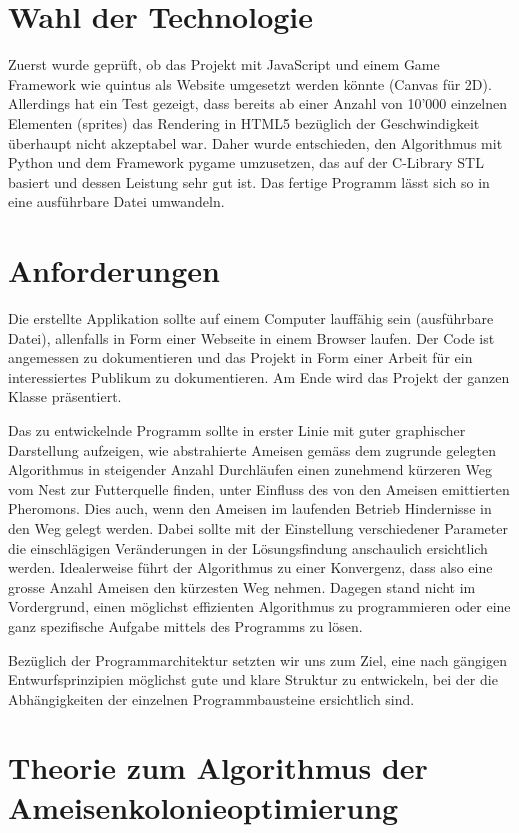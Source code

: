 \section{Wahl der Technologie}

Zuerst wurde geprüft, ob das Projekt mit JavaScript und einem Game Framework wie quintus als Website umgesetzt werden könnte (Canvas für 2D). Allerdings hat ein Test gezeigt, dass bereits ab einer Anzahl von 10'000 einzelnen Elementen (sprites) das Rendering in HTML5 bezüglich der Geschwindigkeit überhaupt nicht akzeptabel war. Daher wurde entschieden, den Algorithmus mit Python und dem Framework pygame umzusetzen, das auf der C-Library STL basiert und dessen Leistung sehr gut ist. Das fertige Programm lässt sich so in eine ausführbare Datei umwandeln.

\section{Anforderungen}

Die erstellte Applikation sollte auf einem Computer lauffähig sein (ausführbare Datei), allenfalls in Form einer Webseite in einem Browser laufen. Der Code ist angemessen zu dokumentieren und das Projekt in Form einer Arbeit für ein interessiertes Publikum zu dokumentieren. Am Ende wird das Projekt der ganzen Klasse präsentiert.

Das zu entwickelnde Programm sollte in erster Linie mit guter graphischer Darstellung aufzeigen, wie abstrahierte Ameisen gemäss dem zugrunde gelegten Algorithmus in steigender Anzahl Durchläufen einen zunehmend kürzeren Weg vom Nest zur Futterquelle finden, unter Einfluss des von den Ameisen emittierten Pheromons. Dies auch, wenn den Ameisen im laufenden Betrieb Hindernisse in den Weg gelegt werden. Dabei sollte mit der Einstellung verschiedener Parameter die einschlägigen Veränderungen in der Lösungsfindung anschaulich ersichtlich werden. Idealerweise führt der Algorithmus zu einer Konvergenz, dass also eine grosse Anzahl Ameisen den kürzesten Weg nehmen. Dagegen stand nicht im Vordergrund, einen möglichst effizienten Algorithmus zu programmieren oder eine ganz spezifische Aufgabe mittels des Programms zu lösen.

Bezüglich der Programmarchitektur setzten wir uns zum Ziel, eine nach gängigen Entwurfsprinzipien möglichst gute und klare Struktur zu entwickeln, bei der die Abhängigkeiten der einzelnen Programmbausteine ersichtlich sind.

\section{Theorie zum Algorithmus der Ameisenkolonieoptimierung} 

